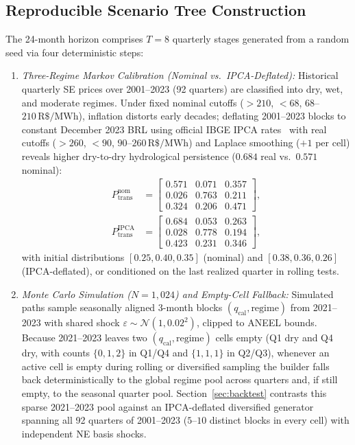 \documentclass[10pt,journal]{IEEEtran}
\begin{document}
\subsection{Reproducible Scenario Tree Construction}
The 24-month horizon comprises $T=8$ quarterly stages generated from a random seed via four deterministic steps:
\begin{enumerate}
    \item \textit{Three-Regime Markov Calibration (Nominal vs.\ IPCA-Deflated):} Historical quarterly SE prices over 2001--2023 (92 quarters) are classified into dry, wet, and moderate regimes. Under fixed nominal cutoffs ($>210$, $<68$, $68$--$210\,\text{R\$/MWh}$), inflation distorts early decades; deflating 2001--2023 blocks to constant December 2023 BRL using official IBGE IPCA rates~\cite{IBGE_IPCA} with real cutoffs ($>260$, $<90$, $90$--$260\,\text{R\$/MWh}$) and Laplace smoothing ($+1$ per cell) reveals higher dry-to-dry hydrological persistence ($0.684$ real vs.\ $0.571$ nominal):
    \begin{align}
    P_{\text{trans}}^{\text{nom}} &= \begin{bmatrix}
    0.571 & 0.071 & 0.357 \\
    0.026 & 0.763 & 0.211 \\
    0.324 & 0.206 & 0.471
    \end{bmatrix}, \nonumber \\
    P_{\text{trans}}^{\text{IPCA}} &= \begin{bmatrix}
    0.684 & 0.053 & 0.263 \\
    0.028 & 0.778 & 0.194 \\
    0.423 & 0.231 & 0.346
    \end{bmatrix},
    \label{eq:ptrans}
    \end{align}
    with initial distributions $[0.25, 0.40, 0.35]$ (nominal) and $[0.38, 0.36, 0.26]$ (IPCA-deflated), or conditioned on the last realized quarter in rolling tests.
    \item \textit{Monte Carlo Simulation ($N = 1,024$) and Empty-Cell Fallback:} Simulated paths sample seasonally aligned 3-month blocks $(q_{\text{cal}}, \text{regime})$ from 2021--2023 with shared shock $\varepsilon \sim \mathcal{N}(1, 0.02^2)$, clipped to ANEEL bounds. Because 2021--2023 leaves two $(q_{\text{cal}}, \text{regime})$ cells empty (Q1 dry and Q4 dry, with counts $\{0,1,2\}$ in Q1/Q4 and $\{1,1,1\}$ in Q2/Q3), whenever an active cell is empty during rolling or diversified sampling the builder falls back deterministically to the global regime pool across quarters and, if still empty, to the seasonal quarter pool. Section~\ref{sec:backtest} contrasts this sparse 2021--2023 pool against an IPCA-deflated diversified generator spanning all 92 quarters of 2001--2023 ($5$--$10$ distinct blocks in every cell) with independent NE basis shocks.

\end{enumerate}
\end{document}
